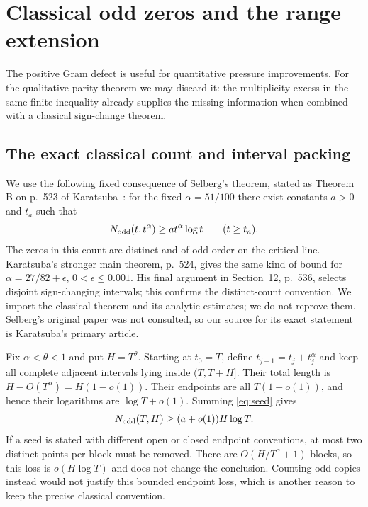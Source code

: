 ﻿\documentclass[11pt]{article}
\theoremstyle{remark}
\begin{document}
\section{Classical odd zeros and the range extension}\label{sec:parityproof}

The positive Gram defect is useful for quantitative pressure improvements.
For the qualitative parity theorem we may discard it: the multiplicity
excess in the same finite inequality already supplies the missing
information when combined with a classical sign-change theorem.

\subsection{The exact classical count and interval packing}

We use the following fixed consequence of Selberg's theorem, stated as
Theorem B on p.~523 of Karatsuba~\cite{Karatsuba}: for the fixed
$\alpha=51/100$ there exist constants $a>0$ and $t_a$ such that
\begin{equation}\label{eq:seed}
 N_{\rm odd}(t,t^\alpha)\ge a t^\alpha\log t\qquad(t\ge t_a).
\end{equation}
The zeros in this count are distinct and of odd order on the critical
line. Karatsuba's stronger main theorem, p.~524, gives the same kind of
bound for $\alpha=27/82+\epsilon$, $0<\epsilon\le0.001$. His final
argument in Section~12, p.~536, selects disjoint sign-changing intervals;
this confirms the distinct-count convention. We import the classical
theorem and its analytic estimates; we do not reprove them. Selberg's
original paper was not consulted, so our source for its exact statement
is Karatsuba's primary article.

Fix $\alpha<\theta<1$ and put $H=T^\theta$. Starting at $t_0=T$, define
$t_{j+1}=t_j+t_j^\alpha$ and keep all complete adjacent intervals lying
inside $(T,T+H]$. Their total length is $H-O(T^\alpha)=H(1-o(1))$.
Their endpoints are all $T(1+o(1))$, and hence their logarithms are
$\log T+o(1)$. Summing \eqref{eq:seed} gives
\begin{equation}\label{eq:packedodd}
 N_{\rm odd}(T,H)\ge (a+o(1))H\log T.
\end{equation}
If a seed is stated with different open or closed endpoint conventions,
at most two distinct points per block must be removed. There are
$O(H/T^\alpha+1)$ blocks, so this loss is $o(H\log T)$ and does not
change the conclusion. Counting odd copies instead would not justify
this bounded endpoint loss, which is another reason to keep the precise
classical convention.
\end{document}
